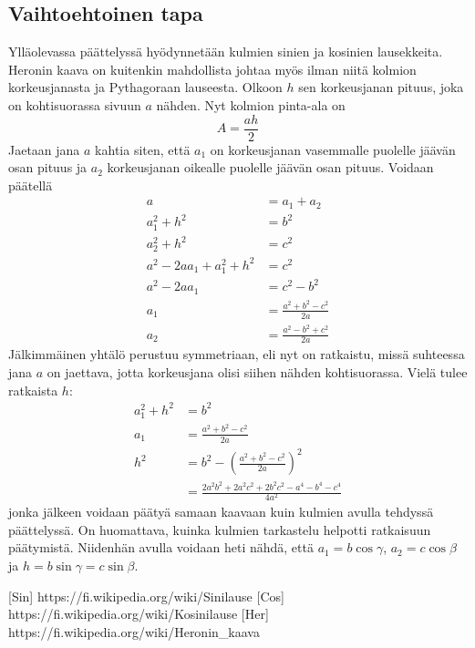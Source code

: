\documentclass[a4paper,12pt]{amsart}
\begin{document}
\subsection{Vaihtoehtoinen tapa}
Ylläolevassa päättelyssä hyödynnetään kulmien sinien ja kosinien lausekkeita. Heronin kaava on kuitenkin mahdollista johtaa myös ilman niitä kolmion korkeusjanasta ja Pythagoraan lauseesta. Olkoon $h$ sen korkeusjanan pituus, joka on kohtisuorassa sivuun $a$ nähden. Nyt kolmion pinta-ala on
\begin{equation}
A=\frac{ah}{2}
\end{equation}
Jaetaan jana $a$ kahtia siten, että $a_1$ on korkeusjanan vasemmalle puolelle jäävän osan pituus ja $a_2$ korkeusjanan oikealle puolelle jäävän osan pituus. Voidaan päätellä
\begin{equation}
\begin{split}
a &= a_1+a_2 \\
a_1^2+h^2 &= b^2 \\
a_2^2+h^2 &= c^2 \\
a^2-2aa_1+a_1^2+h^2 &= c^2 \\
a^2-2aa_1 &= c^2-b^2 \\
a_1 &= \frac{a^2+b^2-c^2}{2a} \\
a_2 &= \frac{a^2-b^2+c^2}{2a}
\end{split}
\end{equation}
Jälkimmäinen yhtälö perustuu symmetriaan, eli nyt on ratkaistu, missä suhteessa jana $a$ on jaettava, jotta korkeusjana olisi siihen nähden kohtisuorassa. Vielä tulee ratkaista $h$:
\begin{equation}
\begin{split}
a_1^2+h^2 &= b^2 \\
a_1 &= \frac{a^2+b^2-c^2}{2a} \\
h^2 &= b^2-\left(\frac{a^2+b^2-c^2}{2a}\right)^2 \\
&= \frac{2a^2 b^2+2a^2 c^2+2b^2 c^2-a^4-b^4-c^4}{4a^2}
\end{split}
\end{equation}
jonka jälkeen voidaan päätyä samaan kaavaan kuin kulmien avulla tehdyssä päättelyssä. On huomattava, kuinka kulmien tarkastelu helpotti ratkaisuun päätymistä. Niidenhän avulla voidaan heti nähdä, että $a_1=b\cos\gamma$, $a_2=c\cos\beta$ ja $h=b\sin\gamma=c\sin\beta$.
\begin{thebibliography}{99}
[Sin] https://fi.wikipedia.org/wiki/Sinilause
[Cos] https://fi.wikipedia.org/wiki/Kosinilause
[Her] https://fi.wikipedia.org/wiki/Heronin\_kaava
\end{thebibliography}
\end{document}
